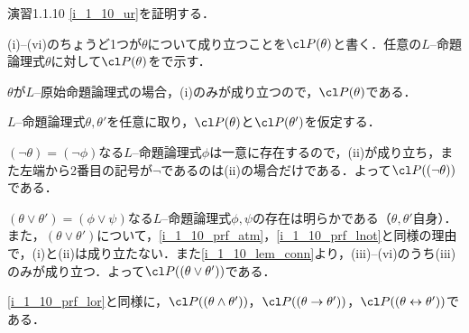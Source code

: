 \begin{excfield}{演習1.1.10}
  \cref{i_1_10_ur}を証明する．

  (i)--(vi)のちょうど1つが$\theta$について成り立つことを$\cl P (\theta)$と書く．任意の$L$--命題論理式$\theta$に対して$\cl P (\theta)$をで示す．
  \begin{step}
    \item \label{i_1_10_prf_atm}
    $\theta$が$L$--原始命題論理式の場合，(i)のみが成り立つので，$\cl P (\theta)$である．
  \end{step}
  $L$--命題論理式$\theta, \theta'$を任意に取り，$\cl P (\theta)$と$\cl P (\theta')$を仮定する．
  \begin{step}[resume]
    \item \label{i_1_10_prf_lnot}
    $(\lnot \theta) = (\lnot \phi)$なる$L$--命題論理式$\phi$は一意に存在するので，(ii)が成り立ち，また左端から2番目の記号が$\lnot$であるのは(ii)の場合だけである．よって$\cl P ((\lnot \theta))$である．
    \item \label{i_1_10_prf_lor}
    $(\theta \lor \theta') = (\phi \lor \psi)$なる$L$--命題論理式$\phi, \psi$の存在は明らかである（$\theta, \theta'$自身）．また，$(\theta \lor \theta')$について，\ref{i_1_10_prf_atm}，\ref{i_1_10_prf_lnot}と同様の理由で，(i)と(ii)は成り立たない．また\cref{i_1_10_lem_conn}より，(iii)--(vi)のうち(iii)のみが成り立つ．よって$\cl P ((\theta \lor \theta'))$である．
    \item \ref{i_1_10_prf_lor}と同様に，$\cl P ((\theta \land \theta'))$，$\cl P ((\theta \ra \theta'))$，$\cl P ((\theta \lra \theta'))$である．
  \end{step}
\end{excfield}



